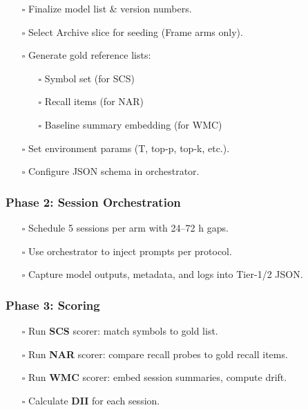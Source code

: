 \documentclass{article}
\begin{document}
\begin{itemize}
\item[$\square$]
  Finalize model list \& version numbers.
\item[$\square$]
  Select Archive slice for seeding (Frame arms only).
\item[$\square$]
  Generate gold reference lists:

  \begin{itemize}
  \tightlist
  \item[$\square$]
    Symbol set (for SCS)
  \item[$\square$]
    Recall items (for NAR)
  \item[$\square$]
    Baseline summary embedding (for WMC)
  \end{itemize}
\item[$\square$]
  Set environment params (T, top-p, top-k, etc.).
\item[$\square$]
  Configure JSON schema in orchestrator.
\end{itemize}

\subsubsection*{Phase 2: Session Orchestration}\label{phase-2-session-orchestration}

\begin{itemize}
\item[$\square$]
  Schedule 5 sessions per arm with 24--72 h gaps.
\item[$\square$]
  Use orchestrator to inject prompts per protocol.
\item[$\square$]
  Capture model outputs, metadata, and logs into Tier-1/2 JSON.
\end{itemize}

\subsubsection*{Phase 3: Scoring}\label{phase-3-scoring}

\begin{itemize}
\item[$\square$]
  Run \textbf{SCS} scorer: match symbols to gold list.
\item[$\square$]
  Run \textbf{NAR} scorer: compare recall probes to gold recall items.
\item[$\square$]
  Run \textbf{WMC} scorer: embed session summaries, compute drift.
\item[$\square$]
  Calculate \textbf{DII} for each session.
\end{itemize}
\end{document}

